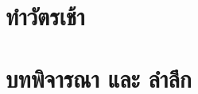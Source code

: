 

\morningPartSettings
%
\part{ทำวัตรเช้า}
%
\morningChapterSettings
%

%
\morningSettingsRestore
%
%
%
%
% 
%
%

\part{บทพิจารณา และ ลำลึก}



% 
% 


%
%
%
% 
%

